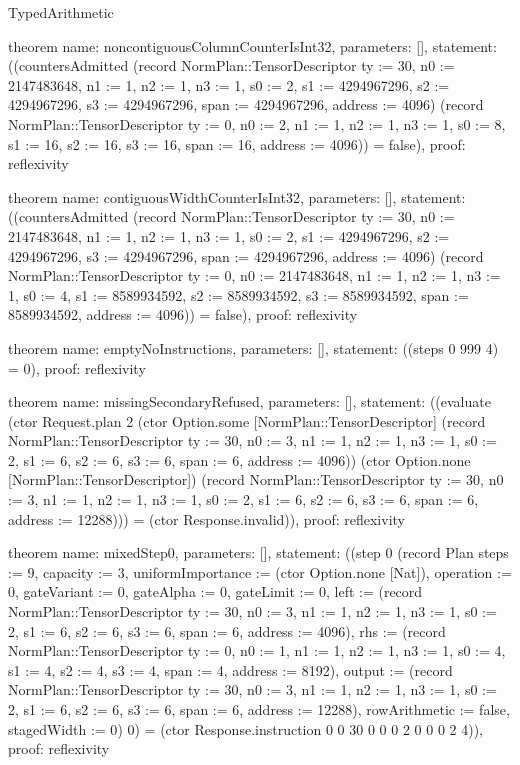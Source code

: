\begin{lexlean}{TypedArithmetic}
\begin{semanticmodule}
theorem{
  name: noncontiguousColumnCounterIsInt32,
  parameters: [],
  statement: ((countersAdmitted (record NormPlan::TensorDescriptor {ty := 30, n0 := 2147483648, n1 := 1, n2 := 1, n3 := 1, s0 := 2, s1 := 4294967296, s2 := 4294967296, s3 := 4294967296, span := 4294967296, address := 4096}) (record NormPlan::TensorDescriptor {ty := 0, n0 := 2, n1 := 1, n2 := 1, n3 := 1, s0 := 8, s1 := 16, s2 := 16, s3 := 16, span := 16, address := 4096})) = false),
  proof: reflexivity{}
}

theorem{
  name: contiguousWidthCounterIsInt32,
  parameters: [],
  statement: ((countersAdmitted (record NormPlan::TensorDescriptor {ty := 30, n0 := 2147483648, n1 := 1, n2 := 1, n3 := 1, s0 := 2, s1 := 4294967296, s2 := 4294967296, s3 := 4294967296, span := 4294967296, address := 4096}) (record NormPlan::TensorDescriptor {ty := 0, n0 := 2147483648, n1 := 1, n2 := 1, n3 := 1, s0 := 4, s1 := 8589934592, s2 := 8589934592, s3 := 8589934592, span := 8589934592, address := 4096})) = false),
  proof: reflexivity{}
}

theorem{
  name: emptyNoInstructions,
  parameters: [],
  statement: ((steps 0 999 4) = 0),
  proof: reflexivity{}
}

theorem{
  name: missingSecondaryRefused,
  parameters: [],
  statement: ((evaluate (ctor Request.plan 2 (ctor Option.some [NormPlan::TensorDescriptor] (record NormPlan::TensorDescriptor {ty := 30, n0 := 3, n1 := 1, n2 := 1, n3 := 1, s0 := 2, s1 := 6, s2 := 6, s3 := 6, span := 6, address := 4096})) (ctor Option.none [NormPlan::TensorDescriptor]) (record NormPlan::TensorDescriptor {ty := 30, n0 := 3, n1 := 1, n2 := 1, n3 := 1, s0 := 2, s1 := 6, s2 := 6, s3 := 6, span := 6, address := 12288}))) = (ctor Response.invalid)),
  proof: reflexivity{}
}

theorem{
  name: mixedStep0,
  parameters: [],
  statement: ((step 0 (record Plan {steps := 9, capacity := 3, uniformImportance := (ctor Option.none [Nat]), operation := 0, gateVariant := 0, gateAlpha := 0, gateLimit := 0, left := (record NormPlan::TensorDescriptor {ty := 30, n0 := 3, n1 := 1, n2 := 1, n3 := 1, s0 := 2, s1 := 6, s2 := 6, s3 := 6, span := 6, address := 4096}), rhs := (record NormPlan::TensorDescriptor {ty := 0, n0 := 1, n1 := 1, n2 := 1, n3 := 1, s0 := 4, s1 := 4, s2 := 4, s3 := 4, span := 4, address := 8192}), output := (record NormPlan::TensorDescriptor {ty := 30, n0 := 3, n1 := 1, n2 := 1, n3 := 1, s0 := 2, s1 := 6, s2 := 6, s3 := 6, span := 6, address := 12288}), rowArithmetic := false, stagedWidth := 0}) 0) = (ctor Response.instruction 0 0 30 0 0 0 2 0 0 0 2 4)),
  proof: reflexivity{}
}


\end{semanticmodule}
\end{lexlean}

